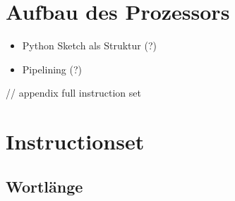 \documentclass[paper=a4,fontsize=12pt,twocolumn]{scrreprt}
\begin{document}

\section{Aufbau des Prozessors}

\begin{itemize}
    \item Python Sketch als Struktur (?)
    \item Pipelining (?)
\end{itemize}






// appendix full instruction set


\section{Instructionset}



\subsection{Wortlänge}
\end{document}
